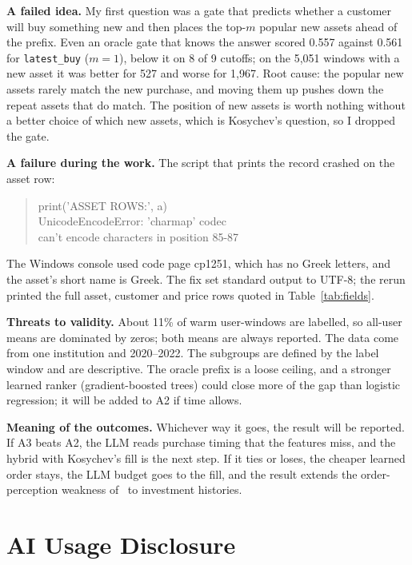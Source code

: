\documentclass[conference]{IEEEtran}
\begin{document}
\textbf{A failed idea.} My first question was a gate that predicts whether a customer will buy something new and then places the top-$m$ popular new assets ahead of the prefix. Even an oracle gate that knows the answer scored 0.557 against 0.561 for \texttt{latest\_buy} ($m=1$), below it on 8 of 9 cutoffs; on the 5{,}051 windows with a new asset it was better for 527 and worse for 1{,}967. Root cause: the popular new assets rarely match the new purchase, and moving them up pushes down the repeat assets that do match. The position of new assets is worth nothing without a better choice of which new assets, which is Kosychev's question, so I dropped the gate.

\textbf{A failure during the work.} The script that prints the record crashed on the asset row:
\begin{quote}\footnotesize\ttfamily
print('ASSET ROWS:', a)\\
UnicodeEncodeError: 'charmap' codec\\
\hspace*{1em}can't encode characters in position 85-87
\end{quote}
The Windows console used code page cp1251, which has no Greek letters, and the asset's short name is Greek. The fix set standard output to UTF-8; the rerun printed the full asset, customer and price rows quoted in Table~\ref{tab:fields}.

\textbf{Threats to validity.} About 11\% of warm user-windows are labelled, so all-user means are dominated by zeros; both means are always reported. The data come from one institution and 2020--2022. The subgroups are defined by the label window and are descriptive. The oracle prefix is a loose ceiling, and a stronger learned ranker (gradient-boosted trees) could close more of the gap than logistic regression; it will be added to A2 if time allows.

\textbf{Meaning of the outcomes.} Whichever way it goes, the result will be reported. If A3 beats A2, the LLM reads purchase timing that the features miss, and the hybrid with Kosychev's fill is the next step. If it ties or loses, the cheaper learned order stays, the LLM budget goes to the fill, and the result extends the order-perception weakness of~\cite{llmrank} to investment histories.

\section{AI Usage Disclosure}
\end{document}

